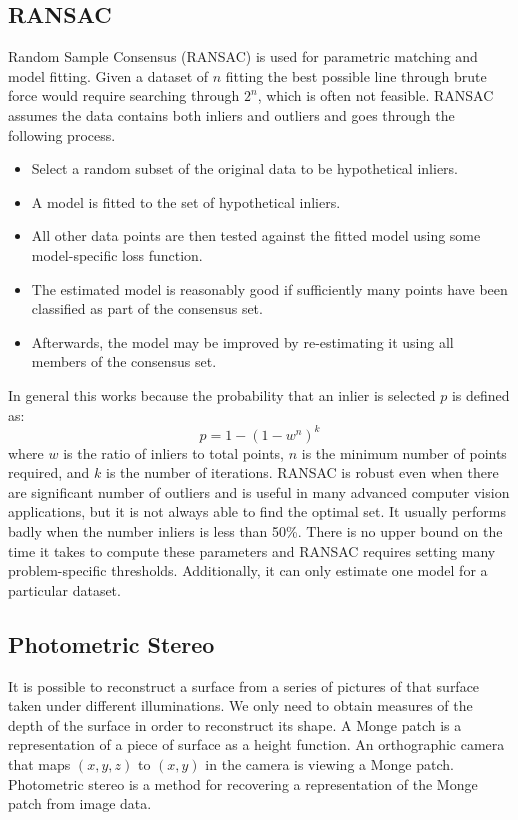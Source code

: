 \documentclass{math}
\begin{document}
\subsection*{RANSAC}
Random Sample Consensus (RANSAC) is used for parametric matching and model
fitting. Given a dataset of \( n \) fitting the best possible line through
brute force would require searching through \( 2^n \), which is often not
feasible. RANSAC assumes the data contains both inliers and outliers and goes
through the following process.
\begin{itemize}
  \item Select a random subset of the original data to be hypothetical inliers.
  \item A model is fitted to the set of hypothetical inliers.
  \item All other data points are then tested against the fitted model using
    some model-specific loss function.
  \item The estimated model is reasonably good if sufficiently many points have
    been classified as part of the consensus set.
  \item Afterwards, the model may be improved by re-estimating it using all
    members of the consensus set.
\end{itemize}
In general this works because the probability that an inlier is selected \( p \)
is defined as:
\[ p = 1-(1-w^n)^k \]
where \( w \) is the ratio of inliers to total points, \( n \) is the minimum
number of points required, and \( k \) is the number of iterations. RANSAC
is robust even when there are significant number of outliers and is useful in
many advanced computer vision applications, but it is not always able to find
the optimal set. It usually performs badly when the number inliers is less than
50\%. There is no upper bound on the time it takes to compute these parameters
and RANSAC requires setting many problem-specific thresholds. Additionally, it
can only estimate one model for a particular dataset.

\subsection*{Photometric Stereo}
It is possible to reconstruct a surface from a series of pictures of that
surface taken under different illuminations. We only need to obtain measures
of the depth of the surface in order to reconstruct its shape. A Monge
patch is a representation of a piece of surface as a height function. An
orthographic camera that maps \( (x,y,z) \) to \( (x,y) \) in the camera is
viewing a Monge patch. Photometric stereo is a method for recovering a
representation of the Monge patch from image data.
\end{document}
